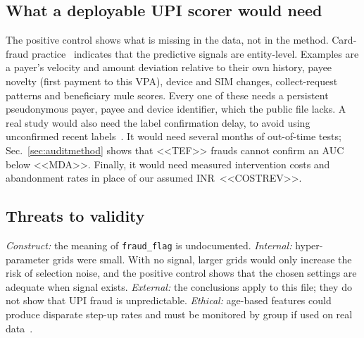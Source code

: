 \documentclass[conference]{IEEEtran}
\newcommand{\inr}{INR~}
\begin{document}
\subsection{What a deployable UPI scorer would need}
The positive control shows what is missing in the data, not in the method. Card-fraud practice~\cite{whitrow2009,bahnsen2016} indicates that the predictive signals are entity-level. Examples are a payer's velocity and amount deviation relative to their own history, payee novelty (first payment to this VPA), device and SIM changes, collect-request patterns and beneficiary mule scores. Every one of these needs a persistent pseudonymous payer, payee and device identifier, which the public file lacks. A real study would also need the label confirmation delay, to avoid using unconfirmed recent labels~\cite{dalpozzolo2018}. It would need several months of out-of-time tests; Sec.~\ref{sec:auditmethod} shows that <<TEF>> frauds cannot confirm an AUC below <<MDA>>. Finally, it would need measured intervention costs and abandonment rates in place of our assumed \inr<<COSTREV>>.

\subsection{Threats to validity}
\emph{Construct:} the meaning of \texttt{fraud\_flag} is undocumented. \emph{Internal:} hyper-parameter grids were small. With no signal, larger grids would only increase the risk of selection noise, and the positive control shows that the chosen settings are adequate when signal exists. \emph{External:} the conclusions apply to this file; they do not show that UPI fraud is unpredictable. \emph{Ethical:} age-based features could produce disparate step-up rates and must be monitored by group if used on real data~\cite{mitchell2019}.

\end{document}
